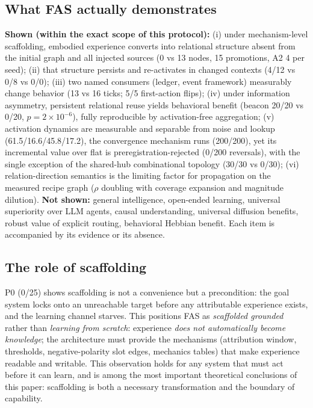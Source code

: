 \documentclass[10pt,a4paper]{article}
\begin{document}
\subsection{What FAS actually demonstrates}
\textbf{Shown (within the exact scope of this protocol):} (i) under mechanism-level scaffolding, embodied experience converts into relational structure absent from the initial graph and all injected sources (0 vs 13 nodes, 15 promotions, A2 4 per seed); (ii) that structure persists and re-activates in changed contexts (4/12 vs 0/8 vs 0/0); (iii) two named consumers (ledger, event framework) measurably change behavior (13 vs 16 ticks; 5/5 first-action flips); (iv) under information asymmetry, persistent relational reuse yields behavioral benefit (beacon 20/20 vs 0/20, $p{=}2\times10^{-6}$), fully reproducible by activation-free aggregation; (v) activation dynamics are measurable and separable from noise and lookup (61.5/16.6/45.8/17.2), the convergence mechanism runs (200/200), yet its incremental value over flat is preregistration-rejected (0/200 reversals), with the single exception of the shared-hub combinational topology (30/30 vs 0/30); (vi) relation-direction semantics is the limiting factor for propagation on the measured recipe graph ($\rho$ doubling with coverage expansion and magnitude dilution). \textbf{Not shown:} general intelligence, open-ended learning, universal superiority over LLM agents, causal understanding, universal diffusion benefits, robust value of explicit routing, behavioral Hebbian benefit. Each item is accompanied by its evidence or its absence.

\subsection{The role of scaffolding}
P0 (0/25) shows scaffolding is not a convenience but a precondition: the goal system locks onto an unreachable target before any attributable experience exists, and the learning channel starves. This positions FAS as \emph{scaffolded grounded} rather than \emph{learning from scratch}: experience \emph{does not automatically become knowledge}; the architecture must provide the mechanisms (attribution window, thresholds, negative-polarity slot edges, mechanics tables) that make experience readable and writable. This observation holds for any system that must act before it can learn, and is among the most important theoretical conclusions of this paper: scaffolding is both a necessary transformation and the boundary of capability.
\end{document}
